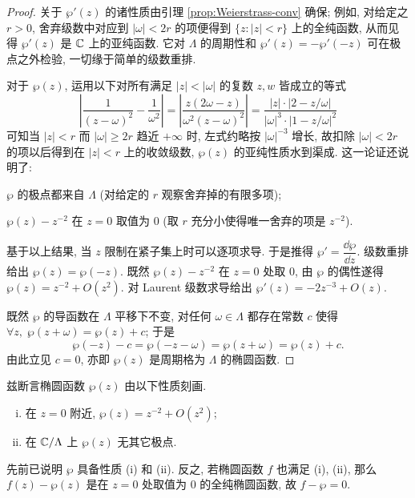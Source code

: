 \begin{proof}
	关于 $\wp'(z)$ 的诸性质由引理 \ref{prop:Weierstrass-conv} 确保; 例如, 对给定之 $r > 0$, 舍弃级数中对应到 $|\omega| < 2r$ 的项便得到 $\{z: |z| < r \}$ 上的全纯函数, 从而见得 $\wp'(z)$ 是 $\mathbb{C}$ 上的亚纯函数. 它对 $\Lambda$ 的周期性和 $\wp'(z) = -\wp'(-z)$ 可在极点之外检验, 一切缘于简单的级数重排.

	对于 $\wp(z)$, 运用以下对所有满足 $|z| < |\omega|$ 的复数 $z, w$ 皆成立的等式
	\begin{equation}\label{eqn:wp-estimate}
		\left| \dfrac{1}{(z-\omega)^2} - \dfrac{1}{\omega^2} \right| = \left| \dfrac{ z (2\omega - z) }{\omega^2 (z - \omega)^2} \right| = \dfrac{ |z| \cdot \left| 2 - z/\omega \right| }{ |\omega|^3 \cdot \left| 1 - z/\omega \right|^2 }
	\end{equation}
	可知当 $|z| < r$ 而 $|\omega| \geq 2r$ 趋近 $+\infty$ 时, 左式约略按 $|\omega|^{-3}$ 增长, 故扣除 $|\omega| < 2r$ 的项以后得到在 $|z| < r$ 上的收敛级数, $\wp(z)$ 的亚纯性质水到渠成. 这一论证还说明了:
	\begin{compactitem}
		\item $\wp$ 的极点都来自 $\Lambda$ (对给定的 $r$ 观察舍弃掉的有限多项);
		\item $\wp(z) - z^{-2}$ 在 $z=0$ 取值为 $0$ (取 $r$ 充分小使得唯一舍弃的项是 $z^{-2}$).
	\end{compactitem}
	
	基于以上结果, 当 $z$ 限制在紧子集上时可以逐项求导. 于是推得 $\wp' = \dfrac{\dd \wp}{\dd z}$. 级数重排给出 $\wp(z) = \wp(-z)$. 既然 $\wp(z) - z^{-2}$ 在 $z=0$ 处取 $0$, 由 $\wp$ 的偶性遂得 $\wp(z) = z^{-2} + O(z^2)$. 对 Laurent 级数求导给出 $\wp'(z) = -2z^{-3} + O(z)$.
	
	既然 $\wp$ 的导函数在 $\Lambda$ 平移下不变, 对任何 $\omega \in \Lambda$ 都存在常数 $c$ 使得 $\forall z, \; \wp(z+\omega) = \wp(z) + c$; 于是
	\[ \wp(-z) - c = \wp(-z-\omega) = \wp(z + \omega) = \wp(z) + c. \]
	由此立见 $c=0$, 亦即 $\wp(z)$ 是周期格为 $\Lambda$ 的椭圆函数.
\end{proof}

\begin{remark}
	兹断言椭圆函数 $\wp(z)$ 由以下性质刻画.
	\begin{enumerate}[(i)]
		\item 在 $z=0$ 附近, $\wp(z) = z^{-2} + O(z^2)$;
		\item 在 $\mathbb{C}/\Lambda$ 上 $\wp(z)$ 无其它极点.
	\end{enumerate}
	先前已说明 $\wp$ 具备性质 (i) 和 (ii). 反之, 若椭圆函数 $f$ 也满足 (i), (ii), 那么 $f(z) - \wp(z)$ 是在 $z=0$ 处取值为 $0$ 的全纯椭圆函数, 故 $f - \wp = 0$.
\end{remark}

